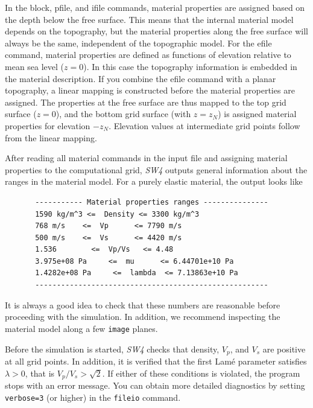 \documentclass[11pt]{report}
\begin{document}
In the block, pfile, and ifile commands, material properties are assigned based on the depth below
the free surface. This means that the internal material model depends on the topography, but the
material properties along the free surface will always be the same, independent of the topographic
model. For the efile command, material properties are defined as functions of elevation relative to
mean sea level ($z=0$). In this case the topography information is embedded in the material
description. If you combine the efile command with a planar topography, a linear mapping is
constructed before the material properties are assigned. The properties at the free surface are thus
mapped to the top grid surface ($z=0$), and the bottom grid surface (with $z=z_N$) is assigned
material properties for elevation $-z_N$. Elevation values at intermediate grid points follow from
the linear mapping.

After reading all material commands in the input file and assigning material properties to the
computational grid, \emph{SW4} outputs general information about the ranges in the material
model. For a purely elastic material, the output looks like
\begin{verbatim}
       ----------- Material properties ranges ---------------
       1590 kg/m^3 <=  Density <= 3300 kg/m^3
       768 m/s    <=  Vp      <= 7790 m/s
       500 m/s    <=  Vs      <= 4420 m/s
       1.536        <=  Vp/Vs   <= 4.48
       3.975e+08 Pa     <=  mu      <= 6.44701e+10 Pa
       1.4282e+08 Pa     <=  lambda  <= 7.13863e+10 Pa
       ------------------------------------------------------
\end{verbatim}
It is always a good idea to check that these numbers are reasonable before proceeding with the
simulation. In addition, we recommend inspecting the material model along a few \verb+image+ planes.

Before the simulation is started, \emph{SW4} checks that density, $V_p$, and $V_s$ are
positive at all grid points. In addition, it is verified that the first Lam\'e parameter satisfies
$\lambda>0$, that is $V_p/V_s > \sqrt{2}$. If either of these conditions is violated, the program
stops with an error message. You can obtain more detailed diagnostics by setting \verb+verbose=3+
(or higher) in the \verb+fileio+ command.


\end{document}
